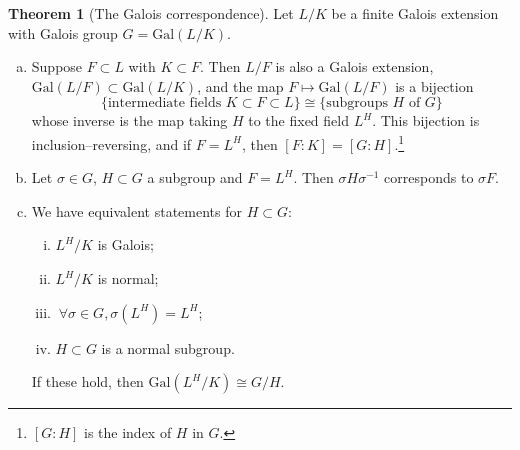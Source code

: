 \documentclass{article}
\theoremstyle{definition}
\newtheorem{theorem}{Theorem}[section]
\begin{document}
\begin{theorem}[The Galois correspondence]
    Let $L/K$ be a finite Galois extension with Galois group $G = \text{Gal}(L/K)$.
    \begin{enumerate}[(a)]
        \item Suppose $F \subset L$ with $K \subset F$. Then $L/F$ is also a Galois extension, $\text{Gal}(L/F)\subset \text{Gal}(L/K)$, and the map $F \mapsto \text{Gal}(L/F)$ is a bijection \[
        \{\text{intermediate fields } K \subset F \subset L\} \cong \{\text{subgroups }H \text{ of }G\}
        \]
        whose inverse is the map taking $H$ to the fixed field $L^H$. This bijection is inclusion--reversing, and if $F=L^H$, then $[F : K] = [G : H]$.\footnote{$[G:H]$ is the index of $H$ in $G$.}
        \item Let $\sigma \in G$, $H \subset G$ a subgroup and $F = L^H$. Then $\sigma H \sigma^{-1}$ corresponds to $\sigma F$.
        \item We have equivalent statements for $H \subset G$:
        \begin{enumerate}[(i)]
            \item $L^H/K$ is Galois;
            \item $L^H/K$ is normal;
            \item $~\forall \sigma \in G, \sigma(L^H)=L^H$;
            \item $H \subset G$ is a normal subgroup.
        \end{enumerate} 
        If these hold, then $\text{Gal}(L^H/K)\cong G/H$.
    \end{enumerate}
\end{theorem}
\end{document}
